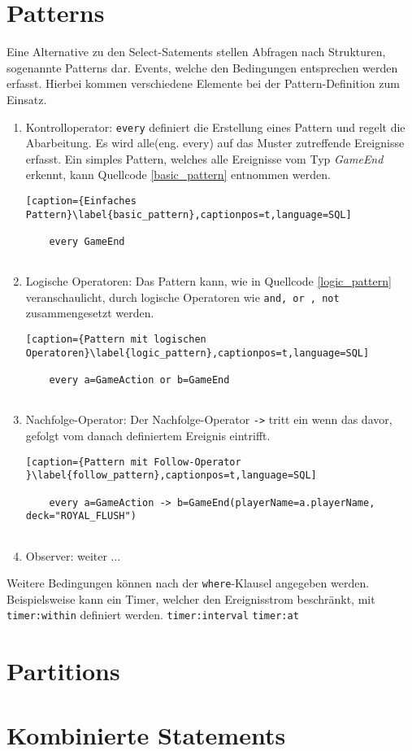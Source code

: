 \section{Patterns}

Eine Alternative zu den Select-Satements stellen Abfragen nach Strukturen, sogenannte Patterns dar. Events, welche den Bedingungen entsprechen werden erfasst. Hierbei kommen verschiedene Elemente bei der Pattern-Definition zum Einsatz.

\begin{enumerate}
	\item Kontrolloperator: \texttt{every} definiert die Erstellung eines Pattern und regelt die Abarbeitung. Es wird alle(eng. every) auf das Muster zutreffende Ereignisse erfasst. Ein simples Pattern, welches alle Ereignisse vom Typ \textit{GameEnd} erkennt, kann Quellcode \ref{basic_pattern} entnommen werden.
	
	\begin{lstlisting}[caption={Einfaches Pattern}\label{basic_pattern},captionpos=t,language=SQL]
	
	every GameEnd
	
	\end{lstlisting}
	
	\item Logische Operatoren: 
	Das Pattern kann, wie in Quellcode \ref{logic_pattern} veranschaulicht, durch logische Operatoren wie \texttt{and, or , not} zusammengesetzt werden.
	
	\begin{lstlisting}[caption={Pattern mit logischen Operatoren}\label{logic_pattern},captionpos=t,language=SQL]
	
	every a=GameAction or b=GameEnd
	
	\end{lstlisting}
	
	\item Nachfolge-Operator:
	Der Nachfolge-Operator \texttt{->} tritt ein wenn das davor, gefolgt vom danach definiertem Ereignis eintrifft.
	
	\begin{lstlisting}[caption={Pattern mit Follow-Operator }\label{follow_pattern},captionpos=t,language=SQL]
	
	every a=GameAction -> b=GameEnd(playerName=a.playerName, deck="ROYAL_FLUSH") 
	
	\end{lstlisting}
	
	\item Observer:
	weiter ...
\end{enumerate}



Weitere Bedingungen können nach der \texttt{where}-Klausel angegeben werden. Beispielsweise kann ein Timer, welcher den Ereignisstrom beschränkt, mit \texttt{timer:within} definiert werden.
\texttt{timer:interval}
\texttt{timer:at}


\section{Partitions}

\section{Kombinierte Statements}